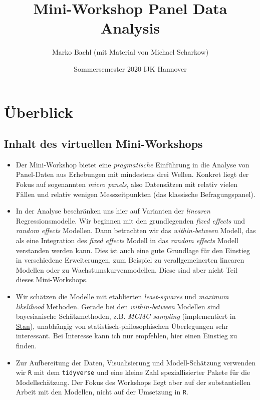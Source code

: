 \documentclass[]{book}
\title{Mini-Workshop Panel Data Analysis}
\author{Marko Bachl (mit Material von Michael Scharkow)}
\date{Sommersemester 2020 \textbar{} IJK Hannover}
\begin{document}
\maketitle

{
\setcounter{tocdepth}{1}
\tableofcontents
}
\hypertarget{uxfcberblick}{%
\chapter{Überblick}\label{uxfcberblick}}

\hypertarget{inhalt-des-virtuellen-mini-workshops}{%
\section{Inhalt des virtuellen Mini-Workshops}\label{inhalt-des-virtuellen-mini-workshops}}

\begin{itemize}
\item
  Der Mini-Workshop bietet eine \emph{pragmatische} Einführung in die Analyse von Panel-Daten aus Erhebungen mit mindestens drei Wellen. Konkret liegt der Fokus auf sogenannten \emph{micro panels}, also Datensätzen mit relativ vielen Fällen und relativ wenigen Messzeitpunkten (das klassische Befragungspanel).
\item
  In der Analyse beschränken uns hier auf Varianten der \emph{linearen} Regressionsmodelle. Wir beginnen mit den grundlegenden \emph{fixed effects} und \emph{random effects} Modellen. Dann betrachten wir das \emph{within-between} Modell, das als eine Integration des \emph{fixed effects} Modell in das \emph{random effects} Modell verstanden werden kann. Dies ist auch eine gute Grundlage für den Einstieg in verschiedene Erweiterungen, zum Beispiel zu verallgemeinerten linearen Modellen oder zu Wachstumskurvenmodellen. Diese sind aber nicht Teil dieses Mini-Workshops.
\item
  Wir schätzen die Modelle mit etablierten \emph{least-squares} und \emph{maximum likelihood} Methoden. Gerade bei den \emph{within-between} Modellen sind bayesianische Schätzmethoden, z.B. \emph{MCMC sampling} (implementiert in \href{https://mc-stan.org/}{Stan}), unabhängig von statistisch-philosophischen Überlegungen sehr interessant. Bei Interesse kann ich nur empfehlen, hier einen Einstieg zu finden.
\item
  Zur Aufbereitung der Daten, Visualisierung und Modell-Schätzung verwenden wir \texttt{R} mit dem \texttt{tidyverse} und eine kleine Zahl speziallisierter Pakete für die Modellschätzung. Der Fokus des Workshops liegt aber auf der substantiellen Arbeit mit den Modellen, nicht auf der Umsetzung in \texttt{R}.
\end{itemize}
\end{document}
